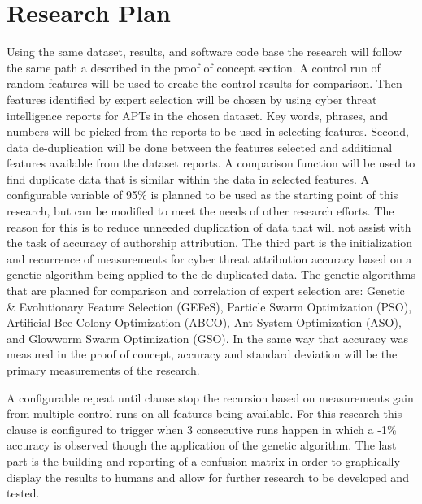 \documentclass[12pt]{report}
\begin{document}
\section{Research Plan}
Using the same dataset, results, and software code base the research will follow the same path a described in the proof of concept section.  A control run of random features will be used to create the control results for comparison.  Then features identified by expert selection will be chosen by using cyber threat intelligence reports for APTs in the chosen dataset.  Key words, phrases, and numbers will be picked from the reports to be used in selecting features.  Second, data de-duplication will be done between the features selected and additional features available from the dataset reports.  A comparison function will be used to find duplicate data that is similar within the data in selected features.  A configurable variable of 95\% is planned to be used as the starting point of this research, but can be modified to meet the needs of other research efforts.  The reason for this is to reduce unneeded duplication of data that will not assist with the task of accuracy of authorship attribution.  The third part is the initialization and recurrence of measurements for cyber threat attribution accuracy based on a genetic algorithm being applied to the de-duplicated data.  The genetic algorithms that are planned for comparison and correlation of expert selection are: Genetic \& Evolutionary Feature Selection (GEFeS), Particle Swarm Optimization (PSO), Artificial Bee Colony Optimization (ABCO), Ant System Optimization (ASO), and Glowworm Swarm Optimization (GSO).  In the same way that accuracy was measured in the proof of concept, accuracy and standard deviation will be the primary measurements of the research.

A configurable repeat until clause stop the recursion based on measurements gain from multiple control runs on all features being available.  For this research this clause is configured to trigger when 3 consecutive runs happen in which a -1\% accuracy is observed though the application of the genetic algorithm.  The last part is the building and reporting of a confusion matrix in order to graphically display the results to humans and allow for further research to be developed and tested. 
\end{document}
